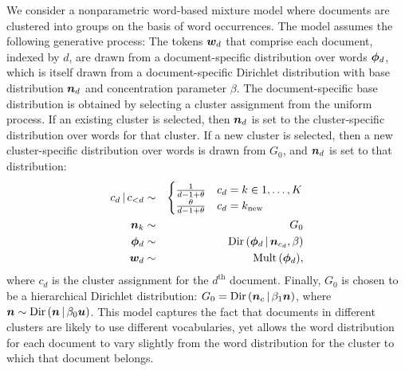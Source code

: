 \documentclass[twoside]{article}
\begin{document}
We consider a nonparametric word-based mixture model where documents
are clustered into groups on the basis of word occurrences. The model
assumes the following generative process: The tokens $\boldsymbol{w}_d$ that
comprise each document, indexed by $d$, are drawn from a
document-specific distribution over words $\boldsymbol{\phi}_d$, which is itself
drawn from a document-specific Dirichlet distribution with base
distribution $\boldsymbol{n}_d$ and concentration parameter $\beta$. The
document-specific base distribution is obtained by selecting a cluster
assignment from the uniform process.  If an existing cluster is
selected, then $\boldsymbol{n}_d$ is set to the cluster-specific distribution
over words for that cluster. If a new cluster is selected, then a new
cluster-specific distribution over words is drawn from $G_0$, and
$\boldsymbol{n}_d$ is set to that distribution:
\begin{eqnarray}
c_d \,|\, c_{< d} &\sim&
\begin{cases} \frac{1}{d-1 + \theta} & c_d = k \in {1, \ldots,
    K}\\
\frac{\theta}{d-1 + \theta} & c_d = k_{\textrm{new}}
\end{cases}\\
\boldsymbol{n}_k &\sim& G_0\\
\boldsymbol{\phi}_d &\sim& \textrm{Dir}\,(\boldsymbol{\phi}_d \,|\, \boldsymbol{n}_{c_d}, \beta)\\
\boldsymbol{w}_d &\sim& \textrm{Mult}\,(\boldsymbol{\phi}_d),
\end{eqnarray}
where $c_d$ is the cluster assignment for the $d^{\textrm{th}}$
document. Finally, $G_0$ is chosen to be a hierarchical Dirichlet
distribution: $G_0 = \textrm{Dir}\,(\boldsymbol{n}_{c} \,|\, \beta_1 \boldsymbol{n})$, where
$\boldsymbol{n} \sim \textrm{Dir}\,(\boldsymbol{n} \,|\, \beta_0 \boldsymbol{u})$. This model captures the
fact that documents in different clusters are likely to use different
vocabularies, yet allows the word distribution for each document to
vary slightly from the word distribution for the cluster to which that
document belongs.
\end{document}
